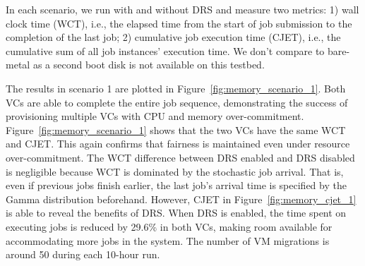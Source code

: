
In each scenario, we run with and without DRS and measure two metrics: 1) wall clock time (WCT), i.e., the elapsed time from the start of job submission to the completion of the last job; 2) cumulative job execution time (CJET), i.e., the cumulative sum of all job instances' execution time. We don't compare to bare-metal as a second boot disk is not available on this testbed. 

The results in scenario 1 are plotted in Figure~\ref{fig:memory_scenario_1}. 
Both VCs are able to complete the entire job sequence, demonstrating the success of 
provisioning multiple VCs with CPU and memory over-commitment. 
Figure~\ref{fig:memory_scenario_1} shows that the two 
VCs have the same WCT and CJET. This again confirms that fairness is maintained even 
under resource over-commitment. The WCT difference between DRS enabled and DRS disabled 
is negligible because WCT is dominated by the stochastic job arrival. That is, 
even if previous jobs finish earlier, the last job's arrival time is specified 
by the Gamma distribution beforehand. 
However, CJET in 
Figure~\ref{fig:memory_cjet_1} is able to reveal the benefits of DRS. When DRS 
is enabled, the time spent on executing jobs is reduced by 29.6\% in both VCs, 
making room available for accommodating more jobs in the system. The number of VM migrations 
is around 50 during each 10-hour run. 

